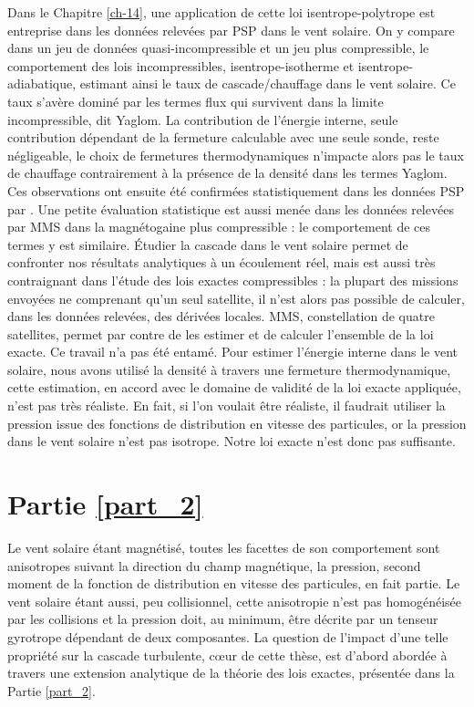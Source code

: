 Dans le Chapitre \ref{ch-14}, une application de cette loi isentrope-polytrope est entreprise dans les données relevées par \ac{PSP} dans le vent solaire. On y compare dans un jeu de données quasi-incompressible et un jeu plus compressible, le comportement des lois incompressibles, isentrope-isotherme et isentrope-adiabatique, estimant ainsi le taux de cascade/chauffage dans le vent solaire. Ce taux s'avère dominé par les termes flux qui survivent dans la limite incompressible, dit Yaglom. La contribution de l'énergie interne, seule contribution dépendant de la fermeture calculable avec une seule sonde, reste négligeable, le choix de fermetures thermodynamiques n'impacte alors pas le taux de chauffage contrairement à la présence de la densité dans les termes Yaglom. Ces observations ont ensuite été confirmées statistiquement dans les données \ac{PSP} par \cite{brodiano_statistical_2022}. Une petite évaluation statistique est aussi menée dans les données relevées par \ac{MMS} dans la magnétogaine plus compressible : le comportement de ces termes y est similaire. Étudier la cascade dans le vent solaire permet de confronter nos résultats analytiques à un écoulement réel, mais est aussi très contraignant dans l'étude des lois exactes compressibles : la plupart des missions envoyées ne comprenant qu'un seul satellite, il n'est alors pas possible de calculer, dans les données relevées, des dérivées locales. \ac{MMS}, constellation de quatre satellites, permet par contre de les estimer et de calculer l'ensemble de la loi exacte. Ce travail n'a pas été entamé. Pour estimer l'énergie interne dans le vent solaire, nous avons utilisé la densité à travers une fermeture thermodynamique, cette estimation, en accord avec le domaine de validité de la loi exacte appliquée, n'est pas très réaliste. En fait, si l'on voulait être réaliste, il faudrait utiliser la pression issue des fonctions de distribution en vitesse des particules, or la pression dans le vent solaire n'est pas isotrope. Notre loi exacte n'est donc pas suffisante. 

\section{Partie \ref{part_2}}

Le vent solaire étant magnétisé, toutes les facettes de son comportement sont anisotropes suivant la direction du champ magnétique, la pression, second moment de la fonction de distribution en vitesse des particules, en fait partie. Le vent solaire étant aussi, peu collisionnel, cette anisotropie n'est pas homogénéisée par les collisions et la pression doit, au minimum, être décrite par un tenseur gyrotrope dépendant de deux composantes. La question de l'impact d'une telle propriété sur la cascade turbulente, cœur de cette thèse, est d'abord abordée à travers une extension analytique de la théorie des lois exactes, présentée dans la Partie \ref{part_2}. 

